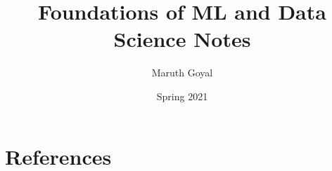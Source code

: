 \documentclass{article}
\title{Foundations of ML and Data Science Notes}
\author{Maruth Goyal}
\date{Spring 2021}
\begin{document}
\maketitle
\tableofcontents











\section{References}


\end{document}
